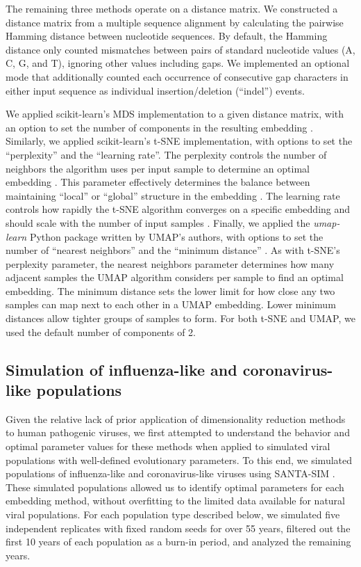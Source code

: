 \documentclass[10pt,letterpaper]{article}
\begin{document}
The remaining three methods operate on a distance matrix.
We constructed a distance matrix from a multiple sequence alignment by calculating the pairwise Hamming distance between nucleotide sequences.
By default, the Hamming distance only counted mismatches between pairs of standard nucleotide values (A, C, G, and T), ignoring other values including gaps.
We implemented an optional mode that additionally counted each occurrence of consecutive gap characters in either input sequence as individual insertion/deletion (``indel'') events.

We applied scikit-learn's MDS implementation to a given distance matrix, with an option to set the number of components in the resulting embedding \cite{Pedregosa2011}.
Similarly, we applied scikit-learn's t-SNE implementation, with options to set the ``perplexity'' and the ``learning rate''.
The perplexity controls the number of neighbors the algorithm uses per input sample to determine an optimal embedding \cite{maaten2008visualizing}.
This parameter effectively determines the balance between maintaining ``local'' or ``global'' structure in the embedding \cite{kobak_2019}.
The learning rate controls how rapidly the t-SNE algorithm converges on a specific embedding \cite{Jacobs1988,maaten2008visualizing} and should scale with the number of input samples \cite{Belkina2019}.
Finally, we applied the \textit{umap-learn} Python package written by UMAP's authors, with options to set the number of ``nearest neighbors'' and the ``minimum distance'' \cite{lel2018umap}.
As with t-SNE's perplexity parameter, the nearest neighbors parameter determines how many adjacent samples the UMAP algorithm considers per sample to find an optimal embedding.
The minimum distance sets the lower limit for how close any two samples can map next to each other in a UMAP embedding.
Lower minimum distances allow tighter groups of samples to form.
For both t-SNE and UMAP, we used the default number of components of 2.

\subsection*{Simulation of influenza-like and coronavirus-like populations}

Given the relative lack of prior application of dimensionality reduction methods to human pathogenic viruses, we first attempted to understand the behavior and optimal parameter values for these methods when applied to simulated viral populations with well-defined evolutionary parameters.
To this end, we simulated populations of influenza-like and coronavirus-like viruses using SANTA-SIM \cite{Jariani2019}.
These simulated populations allowed us to identify optimal parameters for each embedding method, without overfitting to the limited data available for natural viral populations.
For each population type described below, we simulated five independent replicates with fixed random seeds for over 55 years, filtered out the first 10 years of each population as a burn-in period, and analyzed the remaining years.
\end{document}
